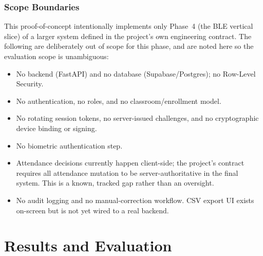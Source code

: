 \documentclass[12pt,a4paper]{report}
\begin{document}
\subsection{Scope Boundaries}\label{sec:scope}
This proof-of-concept intentionally implements only Phase~4 (the BLE vertical slice) of a larger system defined in the project's own engineering contract. The following are deliberately out of scope for this phase, and are noted here so the evaluation scope is unambiguous:
\begin{itemize}
  \item No backend (FastAPI) and no database (Supabase/Postgres); no Row-Level Security.
  \item No authentication, no roles, and no classroom/enrollment model.
  \item No rotating session tokens, no server-issued challenges, and no cryptographic device binding or signing.
  \item No biometric authentication step.
  \item Attendance decisions currently happen client-side; the project's contract requires all attendance mutation to be server-authoritative in the final system. This is a known, tracked gap rather than an oversight.
  \item No audit logging and no manual-correction workflow. CSV export UI exists on-screen but is not yet wired to a real backend.
\end{itemize}

\chapter{Results and Evaluation}
\end{document}
